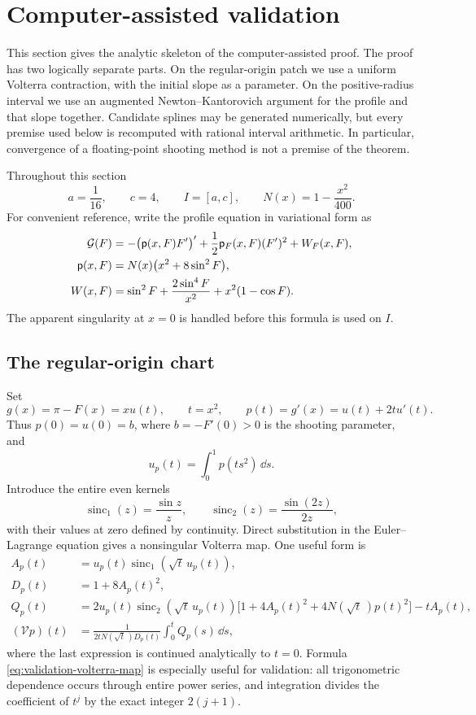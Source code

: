\section{Computer-assisted validation}
\label{sec:validation}

This section gives the analytic skeleton of the computer-assisted proof.  The
proof has two logically separate parts.  On the regular-origin patch we use a
uniform Volterra contraction, with the initial slope as a parameter.  On the
positive-radius interval we use an augmented Newton--Kantorovich argument for
the profile and that slope together.  Candidate splines may be generated
numerically, but every premise used below is recomputed with rational interval
arithmetic.  In particular, convergence of a floating-point shooting method
is not a premise of the theorem.

Throughout this section
\[
 a=\frac1{16},\qquad c=4,\qquad I=[a,c],\qquad
 N(x)=1-\frac{x^2}{400}.
\]
For convenient reference, write the profile equation in variational form as
\begin{align}
 \mathcal G(F)
  &=-\bigl(\mathsf p(x,F)F'\bigr)'
    +\frac12\mathsf p_F(x,F)(F')^2+W_F(x,F),
    \label{eq:validation-profile-operator}\\
 \mathsf p(x,F)
  &=N(x)\bigl(x^2+8\sin^2F\bigr),\nonumber\\
 W(x,F)
  &=\sin^2F+\frac{2\sin^4F}{x^2}+x^2(1-\cos F).
 \nonumber
\end{align}
The apparent singularity at $x=0$ is handled before this formula is used on
$I$.

\subsection{The regular-origin chart}

Set
\[
 g(x)=\pi-F(x)=x u(t),\qquad t=x^2,\qquad
 p(t)=g'(x)=u(t)+2t u'(t).
\]
Thus $p(0)=u(0)=b$, where $b=-F'(0)>0$ is the shooting parameter, and
\begin{equation}
 u_p(t)=\int_0^1 p(ts^2)\,\dd s.
 \label{eq:validation-u-from-p}
\end{equation}
Introduce the entire even kernels
\[
 \operatorname{sinc}_1(z)=\frac{\sin z}{z},\qquad
 \operatorname{sinc}_2(z)=\frac{\sin(2z)}{2z},
\]
with their values at zero defined by continuity.  Direct substitution in the
Euler--Lagrange equation gives a nonsingular Volterra map.  One useful form is
\begin{align}
 A_p(t)&=u_p(t)\operatorname{sinc}_1(\sqrt t\,u_p(t)),\nonumber\\
 D_p(t)&=1+8A_p(t)^2,\nonumber\\
 Q_p(t)&=2u_p(t)\operatorname{sinc}_2(\sqrt t\,u_p(t))
 \bigl[1+4A_p(t)^2+4N(\sqrt t\,)p(t)^2\bigr]-tA_p(t),\nonumber\\
 (\mathcal V p)(t)&=
 \frac{1}{2tN(\sqrt t\,)D_p(t)}\int_0^t Q_p(s)\,\dd s,
 \label{eq:validation-volterra-map}
\end{align}
where the last expression is continued analytically to $t=0$.  Formula
\eqref{eq:validation-volterra-map} is especially useful for validation: all
trigonometric dependence occurs through entire power series, and integration
divides the coefficient of $t^j$ by the exact integer $2(j+1)$.

